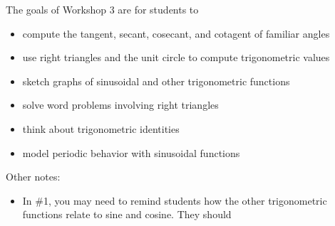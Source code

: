 \documentclass{article}
\begin{document}
\begin{workshop}
\newline
    The goals of Workshop 3 are for students to
    \begin{itemize}
        \item compute the tangent, secant, cosecant, and cotagent of familiar angles
        \item use right triangles and the unit circle to compute trigonometric values 
        \item sketch graphs of sinusoidal and other trigonometric functions
        \item solve word problems involving right triangles
        \item think about trigonometric identities
        \item model periodic behavior with sinusoidal functions
    \end{itemize}
    
    Other notes:
    \begin{itemize}
        \item In \#1, you may need to remind students how the other trigonometric functions relate to sine and cosine. They should 
    \end{itemize}
        
  
\end{workshop}
\end{document}
